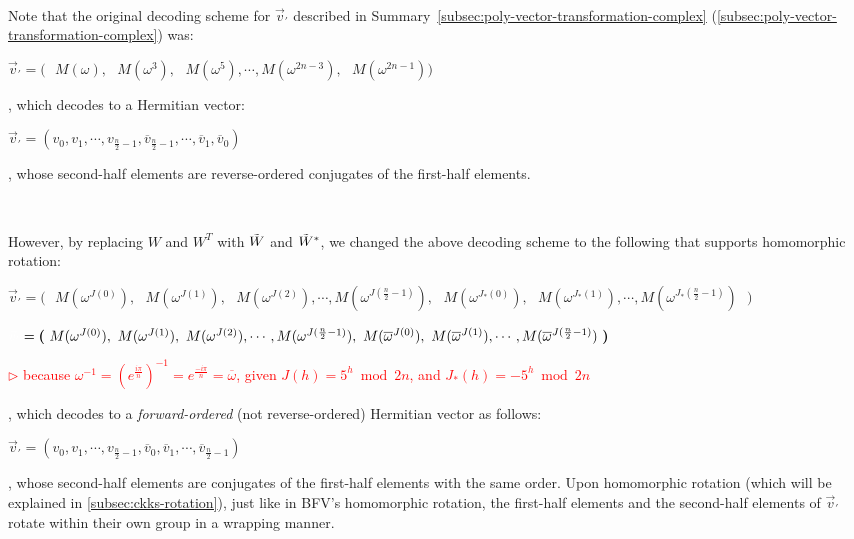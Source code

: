 $ $


 Note that the original decoding scheme for $\vec{v}_{'}$ described in Summary~\ref*{subsec:poly-vector-transformation-complex} (\autoref{subsec:poly-vector-transformation-complex}) was: 

$\vec{v}_{'} = \bm{(} \text{ } M(\omega), \text{ } M(\omega^3), \text{ } M(\omega^5), \cdots, M(\omega^{2n-3}), \text{ } M(\omega^{2n-1}) \bm{)}$

, which decodes to a Hermitian vector:

$\vec{v}_{'} = (v_0, v_1, \cdots, v_{\frac{n}{2} - 1}, \overline v_{\frac{n}{2} - 1}, \cdots, \overline v_1, \overline v_0 )$

, whose second-half elements are reverse-ordered conjugates of the first-half elements. 

$ $

However, by replacing $W$ and $W^T$ with $\tilde W$ and $\tilde W^*$, we changed the above decoding scheme to the following that supports homomorphic rotation:


$\vec{v}_{'} =  \bm{(} \text{ } 
M(\omega^{J(0)}), \text{ } M(\omega^{J(1)}), \text{ } M(\omega^{J(2)}), \cdots,  M(\omega^{J(\frac{n}{2}-1)}), \text{ } M(\omega^{J_*(0)}), \text{ } M(\omega^{J_*(1)}), \cdots,  M(\omega^{J_*(\frac{n}{2}-1)}) \text{ } \bm{)}$

$\textcolor{white}{\vec{v}_{'}} =  \bm{(} \text{ } 
M(\omega^{J(0)}), \text{ } M(\omega^{J(1)}), \text{ } M(\omega^{J(2)}), \cdots,  M(\omega^{J(\frac{n}{2}-1)}), \text{ } M(\overline\omega^{J(0)}), \text{ } M(\overline\omega^{J(1)}), \cdots,  M(\overline\omega^{J(\frac{n}{2}-1)}) \text{ } \bm{)}$ 

\textcolor{red}{ $\rhd$ because $\omega^{-1} = (e^{\frac{i\pi}{n}})^{-1} = e^{\frac{-i\pi}{n}} = \overline\omega$, given  $J(h) = 5^h \bmod 2n$, and $J_*(h) = -5^h \bmod 2n$}

, which decodes to a \textit{forward-ordered} (not reverse-ordered) Hermitian vector as follows:

$\vec{v}_{'} = (v_0, v_1, \cdots, v_{\frac{n}{2} - 1}, \overline v_0, \overline v_1, \cdots, \overline v_{\frac{n}{2} - 1})$

, whose second-half elements are conjugates of the first-half elements with the same order. Upon homomorphic rotation (which will be explained in \autoref{subsec:ckks-rotation}), just like in BFV's homomorphic rotation, the first-half elements and the second-half elements of $\vec{v}_{'}$ rotate within their own group in a wrapping manner. 



